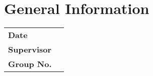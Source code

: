 \restoregeometry

\chapter*{General Information}
\label{chap:info}

\begin{tabular}{l l}

	{\textbf{Date}} \hspace{1cm} & \hspace{1cm} {\datum}\\[0,2cm]
	{\textbf{Supervisor}} \hspace{1cm} & \hspace{1cm} {\betreuer}\\[1,2cm]
	{\textbf{Group No.}} \hspace{1cm} & \hspace{1cm} {\groupnr}\\[0.2cm]

\end{tabular}